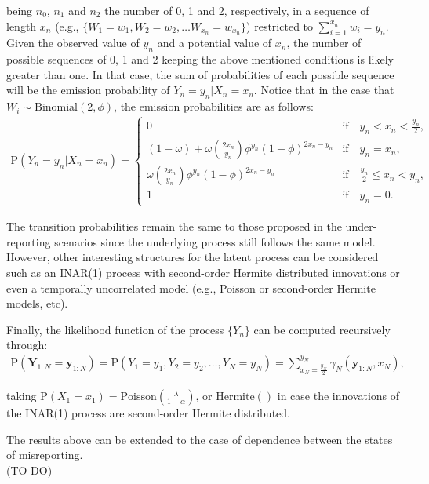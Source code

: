 \documentclass[11pt,a4paper]{article}
\begin{document}
\noindent being $n_0$, $n_1$ and $n_2$ the number of 0, 1 and 2, respectively, in a sequence of length $x_n$ (e.g., $\{W_1=w_1, W_2=w_2, \dots W_{x_n}=w_{x_n}\}$) restricted to $\sum_{i=1}^{x_n}w_i=y_n$. Given the observed value of $y_n$ and a potential value of $x_n$, the number of possible sequences of 0, 1 and 2 keeping the above mentioned conditions is likely greater than one. In that case, the sum of probabilities of each possible sequence will be the emission probability of $Y_n=y_n|X_n=x_n$. Notice that in the case that $W_i \sim \textrm{Binomial}(2,\phi)$, the emission probabilities are as follows:
 \begin{align}
\textrm{P}(Y_n=y_n|X_n=x_n)=\begin{cases} 
0 &  \textrm{if} \quad y_n<x_n<\frac{y_n}{2} , \\
(1-\omega)+\omega \binom{2x_n}{y_n}\phi^{y_n}(1-\phi)^{2x_n-y_n}&  \textrm{if} \quad y_n=x_n , \\
\omega \binom{2x_n}{y_n}\phi^{y_n}(1-\phi)^{2x_n-y_n} &  \textrm{if} \quad  \frac{y_n}{2}\leq x_n <y_n, \\
1 & \textrm{if} \quad  y_n=0.
\end{cases}
\end{align}

\noindent The transition probabilities remain the same to those proposed in the under-reporting scenarios since the underlying process still follows the same model. However, other interesting structures for the latent process can be considered such as an INAR(1) process with second-order Hermite distributed innovations or even a temporally uncorrelated model (e.g., Poisson or second-order Hermite models, etc). 

\noindent Finally, the likelihood function of the process $\{Y_n\}$ can be computed recursively through:
\begin{align}
\label{for:LF}
\textrm{P}(\boldsymbol{Y}_{1:N}=\boldsymbol{y}_{1:N})=\textrm{P}\left(Y_1=y_1,Y_2=y_2,\dots,Y_N=y_N\right)=\sum_{x_N=\frac{y_N}{2}}^{y_N}\gamma_N\left(\boldsymbol{y}_{1:N},x_N\right),
\end{align}

\noindent taking $\textrm{P}(X_1=x_1)=\textrm{Poisson}(\frac{\lambda}{1-\alpha})$, or $\textrm{Hermite}()$ in case the innovations of the INAR(1) process are second-order Hermite distributed. 

\medskip

\noindent The results above can be extended to the case of dependence between the states of misreporting. \\ (TO DO)
\end{document}
